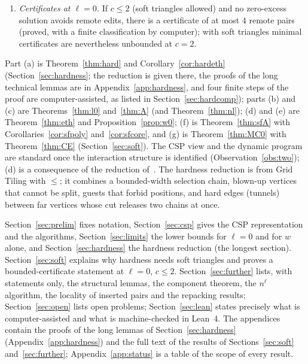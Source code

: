 \begin{theorem}
\begin{enumerate}
\item[(g)] \emph{Certificates at $\ell=0$.} If $c\le2$ (soft triangles allowed) and no zero-excess solution avoids remote edits, there is a certificate of at most $4$ remote pairs (proved, with a finite classification by computer); with soft triangles minimal certificates are nevertheless unbounded at $c=2$.
\end{enumerate}
\end{theorem}
Part (a) is Theorem~\ref{thm:hard} and Corollary~\ref{cor:hardeth} (Section~\ref{sec:hardness}; the reduction is given there, the proofs of the long technical lemmas are in Appendix~\ref{app:hardness}, and four finite steps of the proof are computer-assisted, as listed in Section~\ref{sec:hardcomp}); parts (b) and (c) are Theorems~\ref{thm:l0} and~\ref{thm:A} (and Theorem~\ref{thm:nl}); (d) and (e) are Theorem~\ref{thm:eth} and Proposition~\ref{prop:w0}; (f) is Theorem~\ref{thm:sfA} with Corollaries~\ref{cor:sfpoly} and~\ref{cor:sfcore}, and (g) is Theorem~\ref{thm:MC0} with Theorem~\ref{thm:CE} (Section~\ref{sec:soft}). The CSP view and the dynamic program are standard once the interaction structure is identified (Observation~\ref{obs:two}); (d) is a consequence of the reduction of~\cite{LPS23}. The hardness reduction is from Grid Tiling with $\le$; it combines a bounded-width selection chain, blown-up vertices that cannot be split, guests that forbid positions, and hard edges (tunnels) between far vertices whose cut releases two chains at once.

 Section~\ref{sec:prelim} fixes notation, Section~\ref{sec:csp} gives the CSP representation and the algorithms, Section~\ref{sec:limits} the lower bounds for $\ell=0$ and for $w$ alone, and Section~\ref{sec:hardness} the hardness reduction (the longest section). Section~\ref{sec:soft} explains why hardness needs soft triangles and proves a bounded-certificate statement at $\ell=0$, $c\le2$. Section~\ref{sec:further} lists, with statements only, the structural lemmas, the component theorem, the $n^{\ell}$ algorithm, the locality of inserted pairs and the repacking results; Section~\ref{sec:open} lists open problems; Section~\ref{sec:lean} states precisely what is computer-assisted and what is machine-checked in Lean~4. The appendices contain the proofs of the long lemmas of Section~\ref{sec:hardness} (Appendix~\ref{app:hardness}) and the full text of the results of Sections~\ref{sec:soft} and~\ref{sec:further}; Appendix~\ref{app:status} is a table of the scope of every result.

